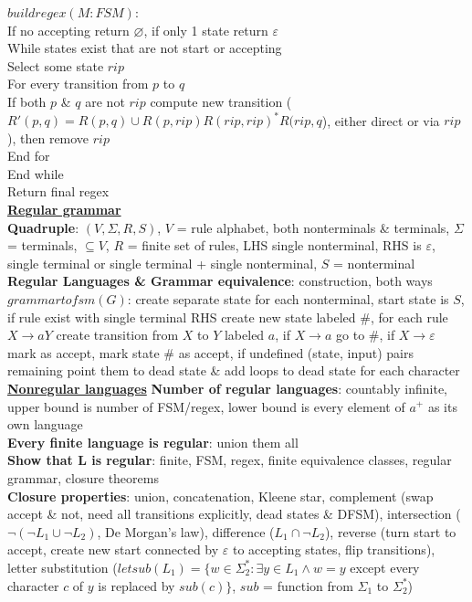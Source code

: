 \documentclass[a4paper]{article}
\begin{document}
\begin{multicols}{2}
        \boldmath$buildregex(M: FSM)$\unboldmath:\\
        If no accepting return $\varnothing$, if only 1 state return $\varepsilon$\\
        While states exist that are not start or accepting\\
        Select some state $rip$\\
        For every transition from $p$ to $q$\\
        If both $p$ \& $q$ are not $rip$ compute new transition ($R'(p,q) = R(p,q) \cup R(p,rip) {R(rip, rip)}^* R(rip, q$), either direct or via $rip$), then remove $rip$\\
        End for\\
        End while\\
        Return final regex\\
        \underline{\textbf{Regular grammar}}\\
        \textbf{Quadruple}: $(V, \Sigma, R, S)$, $V$ = rule alphabet, both nonterminals \& terminals, $\Sigma$ = terminals, $\subseteq V$, $R$ = finite set of rules, LHS single nonterminal, RHS is $\varepsilon$, single terminal or single terminal + single nonterminal, $S$ = nonterminal\\
        \textbf{Regular Languages \& Grammar equivalence}: construction, both ways\\
        \boldmath$grammartofsm(G)$\unboldmath: create separate state for each nonterminal, start state is $S$, if rule exist with single terminal RHS create new state labeled \#, for each rule $X \to aY$ create transition from $X$ to $Y$ labeled $a$, if $X \to a$ go to \#, if $X \to \varepsilon$ mark as accept, mark state \# as accept, if undefined (state, input) pairs remaining point them to dead state \& add loops to dead state for each character\\
        \underline{\textbf{Nonregular languages}}
        \textbf{Number of regular languages}: countably infinite, upper bound is number of FSM/regex, lower bound is every element of $a^+$ as its own language\\
        \textbf{Every finite language is regular}: union them all\\
        \textbf{Show that L is regular}: finite, FSM, regex, finite equivalence classes, regular grammar, closure theorems\\
        \textbf{Closure properties}: union, concatenation, Kleene star, complement (swap accept \& not, need all transitions explicitly, dead states \& DFSM), intersection ($\neg(\neg L_1 \cup \neg L_2)$, De Morgan's law), difference ($L_1 \cap \neg L_2$), reverse (turn start to accept, create new start connected by $\varepsilon$ to accepting states, flip transitions), letter substitution ($letsub(L_1) = \{ w \in \Sigma_2^* : \exists y \in L_1 \wedge w = y$ except every character $c$ of $y$ is replaced by $sub(c) \}$, $sub$ = function from $\Sigma_1$ to $\Sigma_2^*$)\\

\end{multicols}
\end{document}
